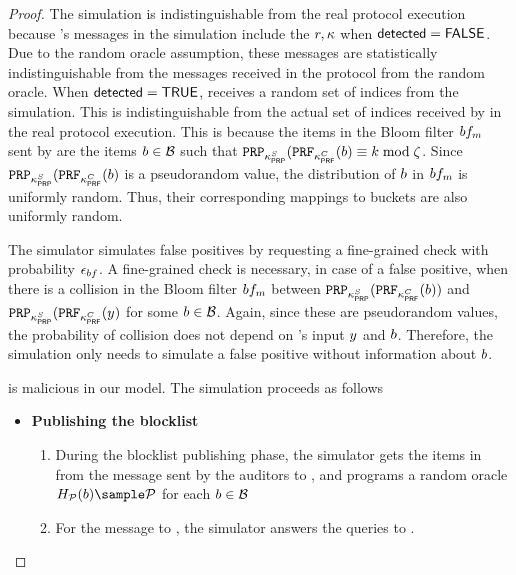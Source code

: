 \begin{proof}
The simulation is indistinguishable from the real protocol execution because \client's messages in the simulation include the $\genericRand,\genericSymmKey$ when $\mathsf{detected} = \mathsf{FALSE}$. Due to the random oracle assumption, these messages are statistically indistinguishable from the messages received in the protocol from the random oracle. When $\mathsf{detected} = \mathsf{TRUE}$, \client receives a random set of indices from the simulation. This is indistinguishable from the actual set of indices \partitionIDSet received by \client in the real protocol execution. This is because the items in the Bloom filter $\bloomFilter[\partitionIdx]$ sent by \client are the items $\genericBlocklistElmt \in \blocklist$ such that $\prp{\prpKeyServer}(\prf{\prfKeyClient}(\genericBlocklistElmt) \equiv \bloomFilterIdx \bmod \numBins$. Since $\prp{\prpKeyServer}(\prf{\prfKeyClient}(\genericBlocklistElmt)$ is a pseudorandom value, the distribution of $\genericBlocklistElmt$ in $\bloomFilter[\partitionIdx]$ is uniformly random. Thus, their corresponding mappings to buckets are also uniformly random. 

The simulator simulates false positives by requesting a fine-grained check with probability $\epsilon_{bf}$. A fine-grained check is necessary, in case of a false positive, when there is a collision in the Bloom filter $\bloomFilter[\partitionIdx]$ between 
$\prp{\prpKeyServer}(\prf{\prfKeyClient}(\genericBlocklistElmt))$ and $\prp{\prpKeyServer}(\prf{\prfKeyClient}(\genericCInputElmt)$ for some $\genericBlocklistElmt \in \blocklist$.  Again, since these are pseudorandom values, the probability of collision does not depend on \client's input $\genericCInputElmt$ and $\genericBlocklistElmt$. Therefore, the simulation only needs \bloomFilterEpsilon to simulate a false positive without information about $\genericBlocklistElmt$. 



%
\server is malicious in our model. The simulation proceeds as follows 


\begin{itemize} 
\item \textbf{Publishing the blocklist}
\begin{enumerate}
\item During the blocklist publishing phase, the simulator gets the items in \blocklist from the \publishList message sent by the auditors to \authOPRFFunc, and programs a random oracle $\primeRO(\genericBlocklistElmt) \sample \primes$ for each $\genericBlocklistElmt \in \blocklist$ 
\item For the message to \distSigningFunc, the simulator answers the queries to \primeRO. 
\end{enumerate}


\end{itemize}
\end{proof}
